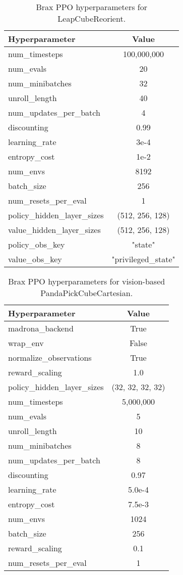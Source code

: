 \begin{table}[ht]
\centering
\begin{tabular}{|l|c|} 
\hline
\textbf{Hyperparameter} & \textbf{Value} \\ \hline
num\_timesteps & 100,000,000 \\ \hline
num\_evals & 20 \\ \hline
num\_minibatches & 32 \\ \hline
unroll\_length & 40 \\ \hline
num\_updates\_per\_batch & 4 \\ \hline
discounting & 0.99 \\ \hline
learning\_rate & 3e-4 \\ \hline
entropy\_cost & 1e-2 \\ \hline
num\_envs & 8192 \\ \hline
batch\_size & 256 \\ \hline
num\_resets\_per\_eval & 1 \\ \hline
policy\_hidden\_layer\_sizes & (512, 256, 128) \\ \hline 
value\_hidden\_layer\_sizes & (512, 256, 128) \\ \hline 
policy\_obs\_key & "state" \\ \hline
value\_obs\_key & "privileged\_state" \\ \hline
\end{tabular}
\caption{Brax PPO hyperparameters for LeapCubeReorient.}
\end{table}


\begin{table}[ht]
\centering
\begin{tabular}{|l|c|} 
\hline
\textbf{Hyperparameter} & \textbf{Value} \\ \hline
madrona\_backend & True \\ \hline
wrap\_env & False \\ \hline
normalize\_observations & True \\ \hline
reward\_scaling & 1.0 \\ \hline
policy\_hidden\_layer\_sizes & (32, 32, 32, 32) \\ \hline 
num\_timesteps & 5,000,000 \\ \hline
num\_evals & 5 \\ \hline
unroll\_length & 10 \\ \hline
num\_minibatches & 8 \\ \hline
num\_updates\_per\_batch & 8 \\ \hline
discounting & 0.97 \\ \hline
learning\_rate & 5.0e-4 \\ \hline
entropy\_cost & 7.5e-3 \\ \hline
num\_envs & 1024 \\ \hline
batch\_size & 256 \\ \hline
reward\_scaling & 0.1 \\ \hline
num\_resets\_per\_eval & 1 \\ \hline
\end{tabular}
\caption{Brax PPO hyperparameters for vision-based PandaPickCubeCartesian.}
\end{table}
